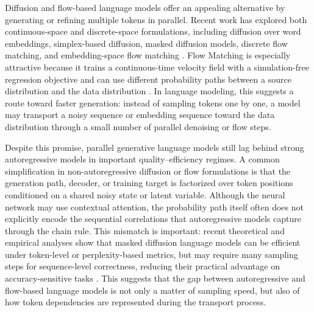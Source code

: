 \documentclass{article} %
\begin{document}
Diffusion and flow-based language models offer an appealing alternative by generating or refining multiple tokens in parallel. 
Recent work has explored both continuous-space and discrete-space formulations, including diffusion over word embeddings, simplex-based diffusion, masked diffusion models, discrete flow matching, and embedding-space flow matching \citep{li2022diffusionlm,han2023ssdlm,gulrajani2023likelihood,gat2024discreteflow,nie2025large,ye2025dream,hu2026elf}. 
Flow Matching is especially attractive because it trains a continuous-time velocity field with a simulation-free regression objective and can use different probability paths between a source distribution and the data distribution \citep{lipman2023flowmatching}. 
In language modeling, this suggests a route toward faster generation: instead of sampling tokens one by one, a model may transport a noisy sequence or embedding sequence toward the data distribution through a small number of parallel denoising or flow steps.

Despite this promise, parallel generative language models still lag behind strong autoregressive models in important quality--efficiency regimes. 
A common simplification in non-autoregressive diffusion or flow formulations is that the generation path, decoder, or training target is factorized over token positions conditioned on a shared noisy state or latent variable. 
Although the neural network may use contextual attention, the probability path itself often does not explicitly encode the sequential correlations that autoregressive models capture through the chain rule. 
This mismatch is important: recent theoretical and empirical analyses show that masked diffusion language models can be efficient under token-level or perplexity-based metrics, but may require many sampling steps for sequence-level correctness, reducing their practical advantage on accuracy-sensitive tasks \citep{feng2025theoretical}. 
This suggests that the gap between autoregressive and flow-based language models is not only a matter of sampling speed, but also of how token dependencies are represented during the transport process.
\end{document}
